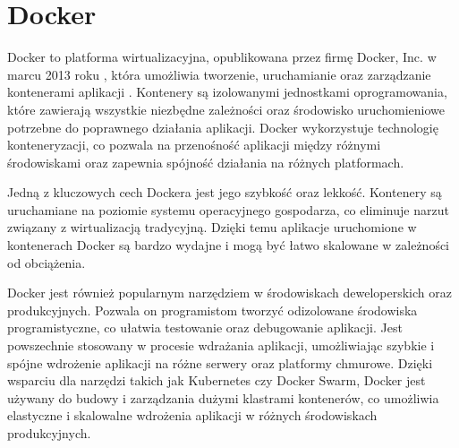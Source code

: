 \section{Docker}

Docker to platforma wirtualizacyjna, opublikowana przez firmę Docker, Inc. w marcu 2013 roku \cite{archiveDotCloudAbout}, która umożliwia tworzenie, uruchamianie oraz zarządzanie kontenerami aplikacji \cite{dockerHome}. 
Kontenery są izolowanymi jednostkami oprogramowania, które zawierają wszystkie niezbędne zależności oraz środowisko uruchomieniowe potrzebne do poprawnego działania aplikacji.
Docker wykorzystuje technologię konteneryzacji, co pozwala na przenośność aplikacji między różnymi środowiskami oraz zapewnia spójność działania na różnych platformach.

Jedną z kluczowych cech Dockera jest jego szybkość oraz lekkość.
Kontenery są uruchamiane na poziomie systemu operacyjnego gospodarza, co eliminuje narzut związany z wirtualizacją tradycyjną.
Dzięki temu aplikacje uruchomione w kontenerach Docker są bardzo wydajne i mogą być łatwo skalowane w zależności od obciążenia.

Docker jest również popularnym narzędziem w środowiskach deweloperskich oraz produkcyjnych.
Pozwala on programistom tworzyć odizolowane środowiska programistyczne, co ułatwia testowanie oraz debugowanie aplikacji.
Jest powszechnie stosowany w procesie wdrażania aplikacji, umożliwiając szybkie i spójne wdrożenie aplikacji na różne serwery oraz platformy chmurowe.
Dzięki wsparciu dla narzędzi takich jak Kubernetes czy Docker Swarm, Docker jest używany do budowy i zarządzania dużymi klastrami kontenerów, co umożliwia elastyczne i skalowalne wdrożenia aplikacji w różnych środowiskach produkcyjnych.